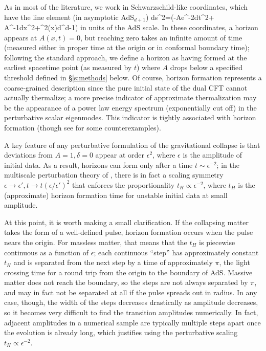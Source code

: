\documentclass[../PhD.tex]{subfiles}
\begin{document}
As in most of the literature, we work in Schwarzschild-like coordinates,
which have the line element (in asymptotic AdS$_{d+1}$)
  ds^2=\left(-Ae^{-2\delta}dt^2+
  A^{-1}dx^2+\sin^2(x)d\Omega^{d-1}\right)
\eeq
in units of the AdS scale.  In these coordinates, a horizon appears at
$A(x,t)=0$, but reaching zero takes an infinite amount of time (measured either
in proper time at the origin or in conformal boundary time); following
the standard approach, we define a horizon as having formed at the earliest
spacetime point (as measured by $t$) where $A$ drops below a specified
threshold defined in \S\ref{s:methods} below.  Of course, horizon formation
represents a coarse-grained description since the pure initial state of
the dual CFT cannot actually thermalize; a more precise indicator of
approximate thermalization may be the appearance of a power law energy spectrum
(exponentially cut off) in the perturbative scalar eigenmodes.  This
indicator is tightly associated with horizon formation (though see
\cite{1608.05402,1410.1869} for some counterexamples).  

A key feature of any perturbative formulation of the gravitational
collapse is that deviations from $A=1,\delta=0$ appear at order $\epsilon^2$,
where $\epsilon$ is the amplitude of initial data.  As a result,
horizons can form only after a time $t\sim\epsilon^{-2}$; in the
multiscale perturbation theory of \cite{1403.6471,1407.6273,1410.1880,1412.4761,1412.3249,1507.02684,1507.08261,1508.04943,1508.05474,1510.07836},
there is in fact a scaling symmetry
$\epsilon\to\epsilon',t\to t(\epsilon/\epsilon')^2$ that enforces the
proportionality $t_H\propto \epsilon^{-2}$, where $t_H$ is the (approximate)
horizon formation time for unstable initial data at small amplitude.

At this point, it is worth making a small clarification.  If the collapsing
matter takes the form of a well-defined pulse, horizon formation occurs when
the pulse nears the origin.  For massless matter, that means that the
$t_H$ is piecewise continuous as a function of $\epsilon$;
each continuous ``step'' has approximately constant $t_H$
and is separated from the next step by a time of approximately
$\pi$, the light crossing time for a round trip from the origin to the boundary
of AdS.  Massive matter does not reach the boundary, so the steps are not
always separated by $\pi$, and may in fact not be separated at all if the pulse
spreads out in radius.  In any case, though, the width of the steps decreases
drastically as amplitude decreases, so it becomes very difficult to find
the transition amplitudes numerically.  In fact, adjacent amplitudes in a
numerical sample are typically multiple steps apart once the evolution is
already long, which justifies using the perturbative scaling
$t_H\propto \epsilon^{-2}$.
\end{document}

